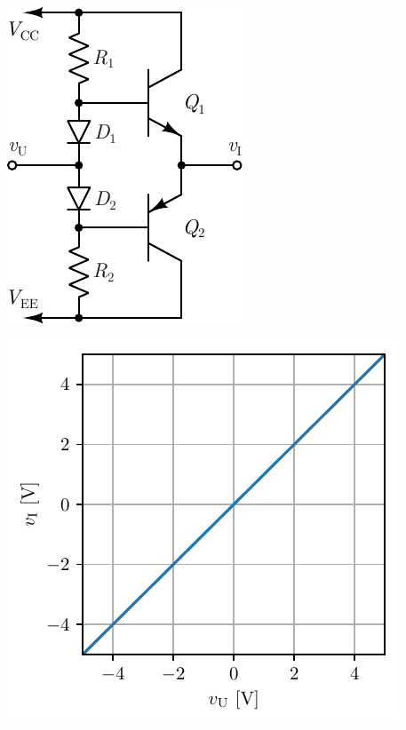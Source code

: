 \documentclass[a4paper, 12pt, diplomski]{etf}
\begin{document}
\begin{center}
\begin{minipage}{0.5\textwidth}
\centering
\includegraphics[scale=1]{fig/PAAB.pdf}
\label{PAAB}
\end{minipage}%
\begin{minipage}{0.5\textwidth}
\includegraphics[scale=1]{fig_teorija/PAABkka.pdf} 
\label{PAABkka} 
\end{minipage}
\end{center}
\end{document}
